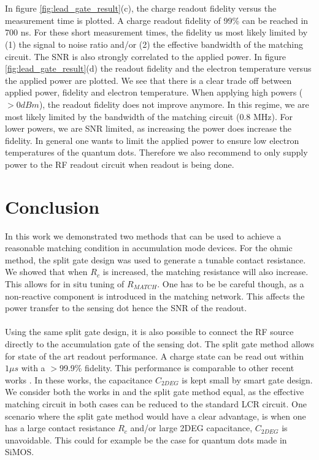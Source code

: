 \documentclass{article}
\begin{document}
	\\ \\
	In figure \ref{fig:lead_gate_result}(c), the charge readout fidelity versus the measurement time is plotted. A charge readout fidelity of 99\% can be reached in 700 ns. For these short measurement times, the fidelity us most likely limited by (1) the signal to noise ratio and/or (2) the effective bandwidth of the matching circuit. The SNR is also strongly correlated to the applied power. In figure \ref{fig:lead_gate_result}(d) the readout fidelity and the electron temperature versus the applied power are plotted. We see that there is a clear trade off between applied power, fidelity and electron temperature.  
	When applying high powers ($>0dBm$), the readout fidelity does not improve anymore. In this regime, we are most likely limited by the bandwidth of the matching circuit (0.8 MHz). For lower powers, we are SNR limited, as increasing the power does increase the fidelity. In general one wants to limit the applied power to ensure low electron temperatures of the quantum dots. Therefore we also recommend to only supply power to the RF readout circuit when readout is being done. 

\section{Conclusion}
In this work we demonstrated two methods that can be used to achieve a reasonable matching condition in accumulation mode devices. For the ohmic method, the split gate design was used to generate a tunable contact resistance. We showed that when $R_c$ is increased, the matching resistance will also increase. This allows for in situ tuning of $R_{MATCH}$. One has to be be careful though, as a non-reactive component is introduced in the matching network. This affects the power transfer to the sensing dot hence the SNR of the readout. \\ \\
Using the same split gate design, it is also possible to connect the RF source directly to the accumulation gate of the sensing dot. The split gate method allows for state of the art readout performance. A charge state can be read out within $1\mu s$ with a $>$99.9\% fidelity. This performance is comparable to other recent works \cite{Connors2020,noiri2020radio}. In these works, the capacitance $C_{2DEG}$ is kept small by smart gate design. We consider both the works in \cite{Connors2020,noiri2020radio} and the split gate method equal, as the effective matching circuit in both cases can be reduced to the standard LCR circuit. One scenario where the split gate method would have a clear advantage, is when one has a large contact resistance $R_c$ and/or large 2DEG capacitance, $C_{2DEG}$ is unavoidable. This could for example be the case for quantum dots made in SiMOS.
\\
\\
\end{document}
